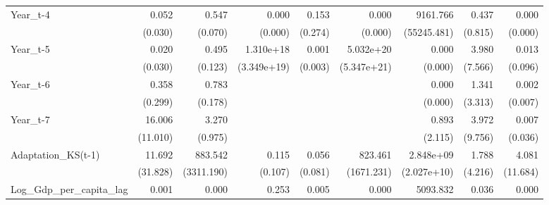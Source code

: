 \begin{table}[htbp]
\begin{tabular}{l*{8}{D{.}{.}{-1}}}
Year\_t-4            &       0.052\sym{***}&       0.547\sym{***}&       0.000         &       0.153         &       0.000\sym{\%}  &    9161.766\sym{\%}  &       0.437         &       0.000\sym{\%}  \\
                    &     (0.030)         &     (0.070)         &     (0.000)         &     (0.274)         &     (0.000)         & (55245.481)         &     (0.815)         &     (0.000)         \\
Year\_t-5            &       0.020\sym{***}&       0.495\sym{***}&   1.310e+18\sym{\%}  &       0.001\sym{***}&   5.032e+20\sym{***}&       0.000\sym{***}&       3.980         &       0.013         \\
                    &     (0.030)         &     (0.123)         & (3.349e+19)         &     (0.003)         & (5.347e+21)         &     (0.000)         &     (7.566)         &     (0.096)         \\
Year\_t-6            &       0.358         &       0.783         &                     &                     &                     &       0.000\sym{***}&       1.341         &       0.002\sym{*}  \\
                    &     (0.299)         &     (0.178)         &                     &                     &                     &     (0.000)         &     (3.313)         &     (0.007)         \\
Year\_t-7            &      16.006\sym{***}&       3.270\sym{***}&                     &                     &                     &       0.893         &       3.972         &       0.007         \\
                    &    (11.010)         &     (0.975)         &                     &                     &                     &     (2.115)         &     (9.756)         &     (0.036)         \\
Adaptation\_KS(t-1)  &      11.692         &     883.542\sym{*}  &       0.115\sym{**} &       0.056\sym{**} &     823.461\sym{***}&   2.848e+09\sym{***}&       1.788         &       4.081         \\
                    &    (31.828)         &  (3311.190)         &     (0.107)         &     (0.081)         &  (1671.231)         & (2.027e+10)         &     (4.216)         &    (11.684)         \\
Log\_Gdp\_per\_capita\_lag&       0.001\sym{\%}  &       0.000\sym{***}&       0.253         &       0.005\sym{*}  &       0.000\sym{***}&    5093.832         &       0.036         &       0.000         \\

\end{tabular}
\end{table}
